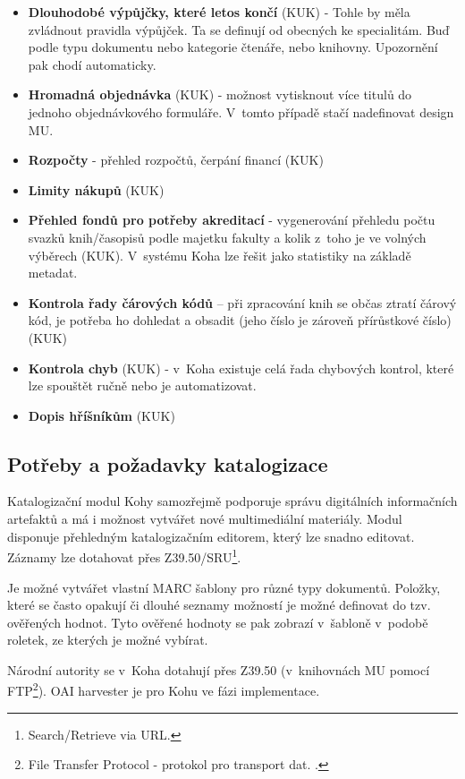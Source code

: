 \documentclass[
	11pt, oneside, printed, draft, 
	table,   %
	lof,     %
	lot     %
]{fithesis3}
\newcommand{\bold}[1]{\textbf{#1}}
\begin{document}
{\begin{itemize}
\item \bold{Dlouhodobé výpůjčky, které letos končí} (KUK) - Tohle by měla zvládnout pravidla výpůjček. Ta se definují od obecných ke specialitám. Buď podle typu dokumentu nebo kategorie čtenáře, nebo knihovny. Upozornění pak chodí automaticky.
\item \bold{Hromadná objednávka} (KUK) - možnost vytisknout více titulů do jednoho objednávkového formuláře. V~tomto případě stačí nadefinovat design MU.
\item \bold{Rozpočty} - přehled rozpočtů, čerpání financí (KUK)
\item \bold{Limity nákupů} (KUK)
\item \bold{Přehled fondů pro potřeby akreditací} - vygenerování přehledu počtu svazků knih/časopisů podle majetku fakulty a kolik z~toho je ve volných výběrech (KUK). V~systému Koha lze řešit jako statistiky na základě metadat.
\item \bold{Kontrola řady čárových kódů} – při zpracování knih se občas ztratí čárový kód, je potřeba ho dohledat a obsadit (jeho číslo je zároveň přírůstkové číslo) (KUK)
\item \bold{Kontrola chyb} (KUK) - v~Koha existuje celá řada chybových kontrol, které lze spouštět ručně nebo je automatizovat.
\item \bold{Dopis hříšníkům} (KUK)
\end{itemize}

\subsection{Potřeby a požadavky katalogizace}

Katalogizační modul Kohy samozřejmě podporuje správu digitálních informačních artefaktů a má i možnost vytvářet nové multimediální materiály. Modul disponuje přehledným katalogizačním editorem, který lze snadno editovat. Záznamy lze dotahovat přes Z39.50/SRU\footnote{Search/Retrieve via URL.}. 

Je možné vytvářet vlastní MARC šablony pro různé typy dokumentů. Položky, které se často opakují či dlouhé seznamy možností je možné definovat do tzv. ověřených hodnot. Tyto ověřené hodnoty se pak zobrazí v~šabloně v~podobě roletek, ze kterých je možné vybírat.

Národní autority se v~Koha dotahují přes Z39.50 (v~knihovnách MU pomocí FTP\footnote{File Transfer Protocol - protokol pro transport dat.
.}). OAI harvester je pro Kohu ve fázi implementace.

}
\end{document}

